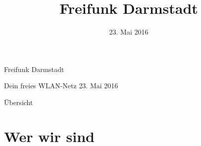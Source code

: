 \documentclass[10pt]{beamer}
\title{Freifunk Darmstadt}
\author{}
\institute[Inst.]{eine Initiative des Chaos Darmstadt e.V.}
\date{\footnotesize 23. Mai 2016}
\begin{document}
{
  \begin{frame}
    \begin{huge}
      Freifunk Darmstadt
    \end{huge}
    \vspace{0.25em}
    \newline
    Dein freies WLAN-Netz
    \newline
    \vspace{0.5em}
    \newline
    \small{23. Mai 2016}
    \vfill
  \end{frame}
}
  \begin{frame}{Übersicht}
    \tableofcontents
  \end{frame}

  \section{Wer wir sind}
\end{document}
